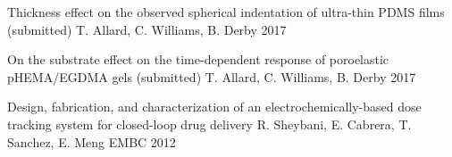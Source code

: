 



\begin{cvhonors}


\cvhonor
{Thickness effect on the observed spherical indentation of ultra-thin PDMS films (submitted)}
{T. Allard, C. Williams, B. Derby}
{}
{2017}


\cvhonor
{On the substrate effect on the time-dependent response of poroelastic pHEMA/EGDMA gels (submitted)}
{T. Allard, C. Williams, B. Derby}
{}
{2017}


\cvhonor
{Design, fabrication, and characterization of an electrochemically-based dose tracking system for closed-loop drug delivery}
{R. Sheybani, E. Cabrera, T. Sanchez, E. Meng}
{EMBC}
{2012}
\end{cvhonors}